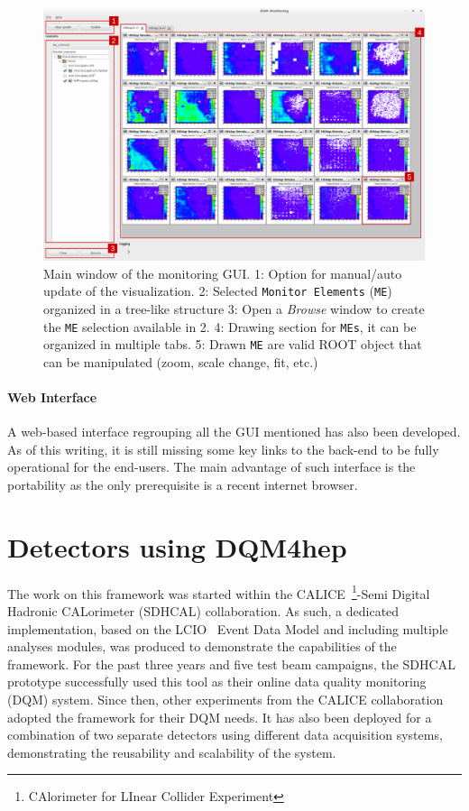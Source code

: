 \documentclass{webofc}
\begin{document}
\begin{figure}
  \centering
  \includegraphics[width=\textwidth]{figs/MaintInterfaceGUI.pdf}
    \caption{\label{fig:DQMMainViz} Main window of the monitoring GUI.
    1: Option for manual/auto update of the visualization.
    2: Selected \texttt{Monitor Elements} (\texttt{ME}) organized in a tree-like structure
    3: Open a \textit{Browse} window to create the \texttt{ME} selection available in 2.
    4: Drawing section for \texttt{MEs}, it can be organized in multiple tabs.
    5: Drawn \texttt{ME} are valid ROOT object that can be manipulated (zoom, scale change, fit, etc.)
    }
\end{figure}

\paragraph{Web Interface}\label{par:WebGUI}
A web-based interface regrouping all the GUI mentioned has also been developed. As of this writing, it is still missing some key links to the back-end to be fully operational for the end-users. The main advantage of such interface is the portability as the only prerequisite is a recent internet browser.

\section{Detectors using DQM4hep}
\label{sec:detectors}

The work on this framework was started within the CALICE~\footnote{CAlorimeter for LInear Collider Experiment}-Semi Digital Hadronic CALorimeter (SDHCAL) collaboration.
As such, a dedicated implementation, based on the LCIO~\cite{LCIO} Event Data Model and including multiple analyses modules, was produced to demonstrate the capabilities of the framework.
For the past three years and five test beam campaigns, the SDHCAL prototype successfully used this tool as their online data quality monitoring (DQM) system.
Since then, other experiments from the CALICE collaboration adopted the framework for their DQM needs. It has also been deployed for a combination of two separate detectors using different data acquisition systems, demonstrating the reusability and scalability of the system.
\end{document}
